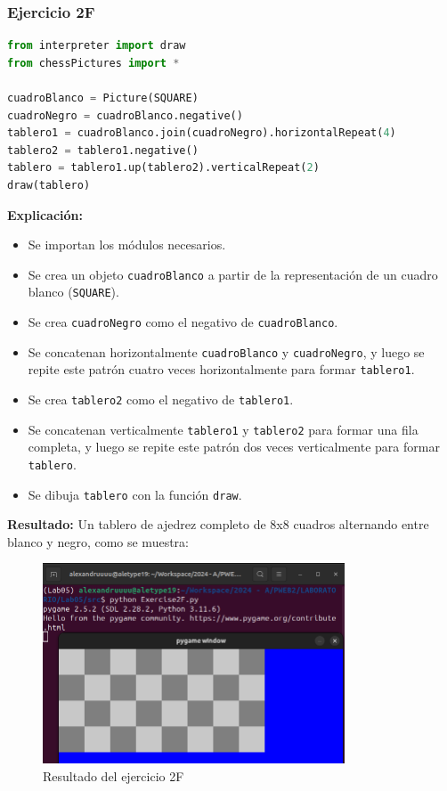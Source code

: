 \documentclass{article}
\begin{document}
\begin{itemize}
\subsubsection{Ejercicio 2F}

\begin{lstlisting}[language=Python, caption={Código del ejercicio 2F}]
from interpreter import draw
from chessPictures import *

cuadroBlanco = Picture(SQUARE)
cuadroNegro = cuadroBlanco.negative()
tablero1 = cuadroBlanco.join(cuadroNegro).horizontalRepeat(4)
tablero2 = tablero1.negative()
tablero = tablero1.up(tablero2).verticalRepeat(2)
draw(tablero)
\end{lstlisting}

\textbf{Explicación:}
\begin{itemize}
    \item Se importan los módulos necesarios.
    \item Se crea un objeto \texttt{cuadroBlanco} a partir de la representación de un cuadro blanco (\texttt{SQUARE}).
    \item Se crea \texttt{cuadroNegro} como el negativo de \texttt{cuadroBlanco}.
    \item Se concatenan horizontalmente \texttt{cuadroBlanco} y \texttt{cuadroNegro}, y luego se repite este patrón cuatro veces horizontalmente para formar \texttt{tablero1}.
    \item Se crea \texttt{tablero2} como el negativo de \texttt{tablero1}.
    \item Se concatenan verticalmente \texttt{tablero1} y \texttt{tablero2} para formar una fila completa, y luego se repite este patrón dos veces verticalmente para formar \texttt{tablero}.
    \item Se dibuja \texttt{tablero} con la función \texttt{draw}.
\end{itemize}

\textbf{Resultado:}
Un tablero de ajedrez completo de 8x8 cuadros alternando entre blanco y negro, como se muestra:

\begin{figure}[H]
    \centering
    \includegraphics[width=0.8\textwidth]{img/6.png}
    \caption{Resultado del ejercicio 2F}
    \label{fig:ejercicio2f}
\end{figure}


\end{itemize}
\end{document}
